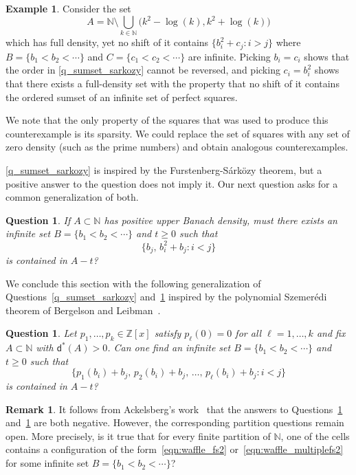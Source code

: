 \documentclass[10pt,dvipsnames]{article}
\newtheorem{question}[theorem]{Question}
\theoremstyle{definition}
\newtheorem{remark}[theorem]{Remark}
\newtheorem{example}[theorem]{Example}
\theoremstyle{plain}
\newcommand{\Z}{\mathbb{Z}}
\newcommand{\N}{\mathbb{N}}
\newcommand{\ubdens}{\mathsf{d}^*}
\newcommand{\Sarkozy}{S\'{a}rk\"{o}zy}
\newcommand{\Szemeredi}{Szemer\'{e}di}
\begin{document}
\begin{example}
\label{ex_reverse_restricted_sumset_squares_is_false}
Consider the set
\[
A=\N\setminus \bigcup_{k\in\N} \big(k^2-\log(k), k^2+\log(k)\big)
\]
which has full density, yet no shift of it contains $\{b_i^2+c_j: i>j\}$ where $B=\{b_1< b_2< \cdots \}$ and $C=\{c_1< c_2< \cdots \}$ are infinite. Picking $b_i=c_i$ shows that the order in \cref{q_sumset_sarkozy} cannot be reversed, and picking $c_i=b_i^2$ shows that there exists a full-density set with the property that no shift of it contains the ordered sumset of an infinite set of perfect squares.

We note that the only property of the squares that was used to produce this counterexample is its sparsity. We could replace the set of squares with any set of zero density (such as the prime numbers) and obtain analogous counterexamples.
\end{example}


\cref{q_sumset_sarkozy} is inspired by the Furstenberg-\Sarkozy{} theorem, but a positive answer to the question does not imply it.
Our next question asks for a common generalization of both.

\begin{question}
\label{q_sumset_sarkozy_basepoint}
If $A\subset\N$ has positive upper Banach density, must there exists an infinite set $B=\{b_1< b_2<\cdots\}$ and $t\geq 0$ such that
\begin{equation}
\label{eqn:waffle_fs2}
\{b_j,\, b_i^2+b_j: i<j\}
\end{equation}
is contained in $A-t$?
\end{question}

We conclude this section with the following generalization of Questions~\ref{q_sumset_sarkozy} and~\ref{q_sumset_sarkozy_basepoint} inspired by the polynomial \Szemeredi{} theorem of Bergelson and Leibman~\cite{bergelson-leibman}.

\begin{question}\label{q_sumset_polynomials}
Let $p_1,\dots,p_k\in\Z[x]$ satisfy $p_\ell(0)=0$ for all $\ell=1,\dots,k$ and fix $A\subset\N$ with $\ubdens(A)>0$.
Can one find an infinite set $B = \{ b_1 < b_2 < \cdots \}$ and $t \ge 0$ such that
\begin{equation}
    \label{eqn:waffle_multiplefs2}
\big\{ p_1(b_i) + b_j,\, p_2(b_i) + b_j,\, \ldots,\, p_\ell(b_i) + b_j: i < j\big\}
\end{equation}
is contained in $A-t$?
\end{question}
\begin{remark}
It follows from Ackelsberg's work~\cite{ackelsberg} that the answers to Questions~\ref{q_sumset_sarkozy_basepoint} and~\ref{q_sumset_polynomials} are both negative. However, the corresponding partition questions remain open. More precisely, is it true that for every finite partition of $\N$, one of the cells contains a configuration of the form~\eqref{eqn:waffle_fs2} or~\eqref{eqn:waffle_multiplefs2} for some infinite set $B=\{b_1<b_2<\cdots\}$?
\end{remark}
\end{document}
